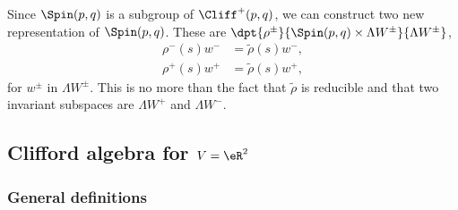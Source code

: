 Since $\Spin(p,q)$ is a subgroup of $\Cliff^+(p,q)$, we can construct two new representation of $\Spin(p,q)$. These are $\dpt{\rho^{\pm}}{\Spin(p,q)\times\Lambda W ^{\pm}}{\Lambda W ^{\pm}}$,
\begin{equation}
\begin{split}
 \rho^-(s)w^-&=\tilde\rho(s)w^-,\\
 \rho^+(s)w^+&=\tilde\rho(s)w^+,
\end{split}
\end{equation}
for $w^{\pm}$ in $\Lambda W ^{\pm}$. This is no more than the fact that $\tilde\rho$ is reducible and that two invariant subspaces are $\Lambda W^+$ and $\Lambda W^-$.
\subsection{Clifford algebra for \texorpdfstring{$V=\eR^2$}{V=R2}}\label{cliffR2}

\subsubsection{General definitions}

